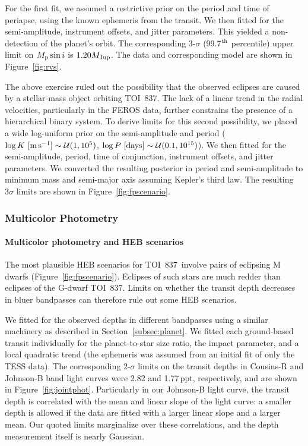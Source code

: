 \documentclass[12pt,twocolumn,tighten]{aastex63}
\newcommand{\tn}{TOI~837} %
\begin{document}
For the first fit, we assumed a restrictive prior on the period and
time of periapse, using the known ephemeris from the transit.  We then
fitted for the semi-amplitude, instrument offsets, and jitter
parameters.  This yielded a non-detection of the planet's orbit.  The
corresponding 3-$\sigma$ (99.7$^{\rm th}$ percentile) upper limit on
$M_{\rm p} \sin i$ is $1.20 M_{\rm Jup}$.  The data and corresponding
model are shown in Figure~\ref{fig:rvs}.

The above exercise ruled out the possibility that the observed
eclipses are caused by a stellar-mass object orbiting \tn.  The lack
of a linear trend in the radial velocities, particularly in the FEROS
data, further constrains the presence of a hierarchical binary system.
To derive limits for this second possibility, we placed a wide
log-uniform prior on the semi-amplitude and period ($\log K\ [{\rm
m\,s^{-1}}] \sim \mathcal{U}(1,10^5)$, $\log P\ [{\rm days}] \sim
\mathcal{U}(0.1, 10^{15})$).  We then fitted for the semi-amplitude,
period, time of conjunction, instrument offsets, and jitter
parameters.  We converted the resulting posterior in period and
semi-amplitude to minimum mass and semi-major axis assuming Kepler's
third law.  The resulting $3\sigma$ limits are shown in
Figure~\ref{fig:fpscenario}.

\subsubsection{Multicolor Photometry}
\label{subsec:colorphot}

\paragraph{Multicolor photometry and HEB scenarios}
The most plausible HEB scenarios for \tn\ involve pairs of eclipsing M
dwarfs (Figure~\ref{fig:fpscenario}).  Eclipses of such stars are much
redder than eclipses of the G-dwarf \tn.  Limits on whether the
transit depth decreases in bluer bandpasses can therefore rule out
some HEB scenarios.

We fitted for the observed depths in different bandpasses using a
similar machinery as described in Section~\ref{subsec:planet}.  We fitted
each ground-based transit individually for the planet-to-star size
ratio, the impact parameter, and a local quadratic trend (the
ephemeris was assumed from an initial fit of only the TESS data).  The
corresponding $2$-$\sigma$ limits on the transit depths in Cousins-R
and Johnson-B band light curves were 2.82 and 1.77$\,$ppt,
respectively, and are shown in
Figure~\ref{fig:jointphot}.  Particularly in our Johnson-B light
curve, the transit depth is correlated with the mean and linear slope
of the light curve: a smaller depth is allowed if the data are fitted
with a larger linear slope and a larger mean.  Our quoted limits
marginalize over these correlations, and the depth measurement itself
is nearly Gaussian.
\end{document}
